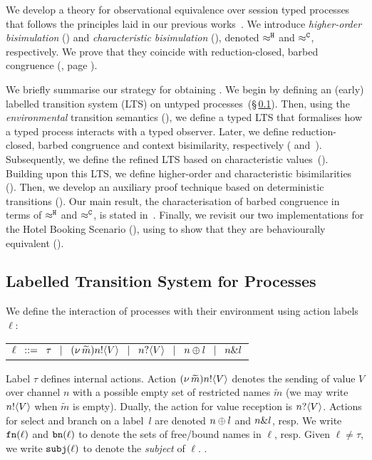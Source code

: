 
\noi
We develop a theory for observational equivalence over
session typed \HOp processes that follows the principles
laid in our previous works~\cite{KYHH2015,KY2015}.
We introduce \emph{higher-order bisimulation} ()
and
\emph{characteristic bisimulation} (), 
denoted $\approx^\mathtt{H}$ and $\approx^\mathtt{C}$, respectively.
We prove that
they coincide with reduction-closed,
barbed congruence (, page \pageref{the:coincidence}).

We briefly summarise our strategy for obtaining .
We begin by defining an (early) labelled transition system (LTS) on
untyped processes~(\S\,\ref{ss:lts}). 
Then, using the \emph{environmental} transition semantics (), 
we define a typed LTS that formalises 
how a typed process interacts with a typed observer. 
Later,  we define 
reduction-closed, barbed congruence and 
context bisimilarity, respectively ( and~). 
Subsequently, 
we define the refined LTS based on characteristic values~().
Building upon this LTS, 
we define
higher-order  and  characteristic bisimilarities  ().
Then, we develop an auxiliary  proof technique based on deterministic transitions ().
Our main result, the 
characterisation of barbed congruence in terms of $\approx^\mathtt{H}$ and $\approx^\mathtt{C}$, is stated in~.
Finally, we revisit our two implementations for the Hotel Booking Scenario (), 
using  
to show that they are behaviourally equivalent ().

\subsection{Labelled Transition System for Processes}
\label{ss:lts}

We define the interaction of processes with their environment using action labels $\ell$:
%
\begin{center}
	\begin{tabular}{l}
		$\ell
			\;\;::=\;\;  \tau 
			\;\;\;|\;\;\;	(\nu\, \widetilde{m}) n ! \langle V \rangle
			\;\;\;|\;\;\;	n ? \langle V \rangle 
			\;\;\;|\;\;\;	n \oplus l 
			\;\;\;|\;\;\;	n \& l$
	\end{tabular}
\end{center}
%
\noi 
Label $\tau$ defines internal actions.
Action
$(\nu\, \widetilde{m}) n ! \langle V \rangle$
denotes the sending of value $V$
over channel $n$ with a possible empty set of restricted names
$\widetilde{m}$ 
(we may write $n ! \langle V \rangle$ when $\widetilde{m}$ is empty).
Dually, the action for value reception is 
$n ? \langle V \rangle$.
Actions for select and branch on
a label~$l$ are denoted $n \oplus l$ and $n \& l$, resp.
We write $\mathtt{fn}(\ell)$ and $\mathtt{bn}(\ell)$ to denote the
sets of free/bound names in $\ell$, resp.
Given $\ell \neq \tau$, we write $\mathtt{subj}(\ell)$
to denote the \emph{subject} of $\ell$.
.

